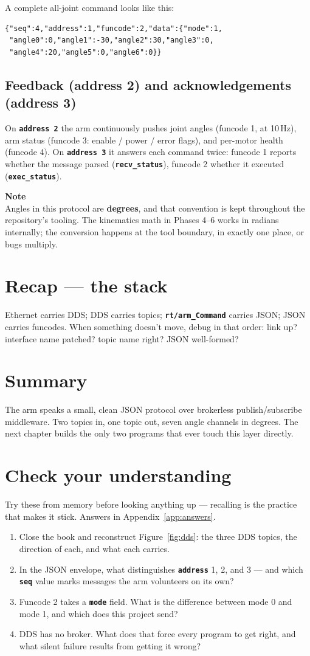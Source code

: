 \documentclass[11pt,twoside,openright]{book}
\newcommand{\code}[1]{\texttt{\bfseries #1}}
\newenvironment{pktnote}{\begin{pktbox}\textbf{Note}\\[4pt]}{\end{pktbox}}
\newenvironment{pktcheck}{%
  \section*{Check your understanding}%
  \addcontentsline{toc}{section}{Check your understanding}%
  \noindent Try these from memory before looking anything up --- recalling
  is the practice that makes it stick. Answers in Appendix~\ref{app:answers}.%
  \begin{enumerate}}{\end{enumerate}}
\begin{document}
A complete all-joint command looks like this:

\begin{lstlisting}[style=pktyaml]
{"seq":4,"address":1,"funcode":2,"data":{"mode":1,
 "angle0":0,"angle1":-30,"angle2":30,"angle3":0,
 "angle4":20,"angle5":0,"angle6":0}}
\end{lstlisting}

\subsection{Feedback (address 2) and acknowledgements (address 3)}

On \code{address 2} the arm continuously pushes joint angles
(funcode 1, at 10\,Hz), arm status (funcode 3: enable / power / error
flags), and per-motor health (funcode 4). On \code{address 3} it answers
each command twice: funcode 1 reports whether the message parsed
(\code{recv\_status}), funcode 2 whether it executed
(\code{exec\_status}).

\begin{pktnote}
Angles in this protocol are \textbf{degrees}, and that convention is kept
throughout the repository's tooling. The kinematics math in Phases 4--6
works in radians internally; the conversion happens at the tool boundary,
in exactly one place, or bugs multiply.
\end{pktnote}

\section{Recap --- the stack}

Ethernet carries DDS; DDS carries topics; \code{rt/arm\_Command} carries
JSON; JSON carries funcodes. When something doesn't move, debug in that
order: link up? interface name patched? topic name right? JSON well-formed?

\section*{Summary}

The arm speaks a small, clean JSON protocol over brokerless
publish/subscribe middleware. Two topics in, one topic out, seven angle
channels in degrees. The next chapter builds the only two programs that
ever touch this layer directly.

\begin{pktcheck}
  \item Close the book and reconstruct Figure~\ref{fig:dds}: the three
    DDS topics, the direction of each, and what each carries.
  \item In the JSON envelope, what distinguishes \code{address} 1, 2,
    and 3 --- and which \code{seq} value marks messages the arm
    volunteers on its own?
  \item Funcode 2 takes a \code{mode} field. What is the difference
    between mode 0 and mode 1, and which does this project send?
  \item DDS has no broker. What does that force every program to get
    right, and what silent failure results from getting it wrong?
\end{pktcheck}
\end{document}

